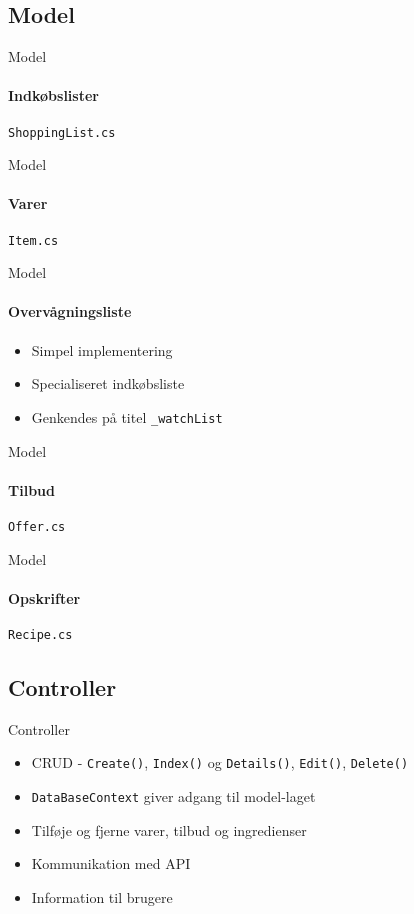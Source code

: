 \subsection{Model}
\begin{frame}{Model}
	\framesubtitle{Indkøbslister}
	\texttt{ShoppingList.cs}
		
\end{frame}
\begin{frame}{Model}
	\framesubtitle{Varer}	
	\texttt{Item.cs}
		
\end{frame}
\begin{frame}{Model}
	\framesubtitle{Overvågningsliste}
	\begin{itemize}
		\item Simpel implementering
		\item Specialiseret indkøbsliste
		\item Genkendes på titel  \texttt{\_watchList}
	\end{itemize}
\end{frame}
\begin{frame}{Model}
	\framesubtitle{Tilbud}
	\texttt{Offer.cs}
		
\end{frame}
\begin{frame}{Model}
	\framesubtitle{Opskrifter}
	\texttt{Recipe.cs}
		
\end{frame}

\subsection{Controller}
\begin{frame}{Controller}
	\begin{itemize}
		\item CRUD - \texttt{Create()}, \texttt{Index()} og \texttt{Details()}, \texttt{Edit()}, \texttt{Delete()}
		\item \texttt{DataBaseContext} giver adgang til model-laget
		\vspace{15pt}
		\item Tilføje og fjerne varer, tilbud og ingredienser
		\item Kommunikation med API
		\item Information til brugere
	\end{itemize}
\end{frame}

